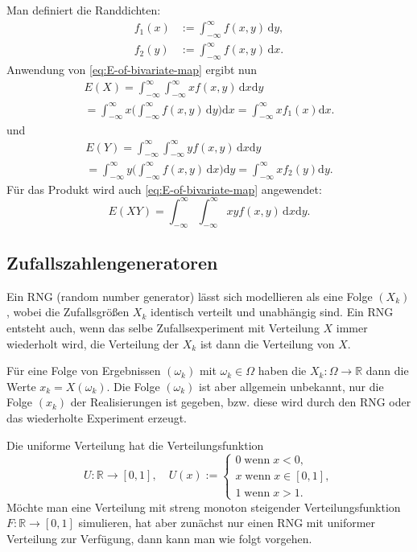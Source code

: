 \documentclass[a4paper,10pt,fleqn,twocolumn,twoside,dvipdfmx]{scrartcl}
\numberwithin{equation}{section}
\newcommand{\R}{\mathbb R}
\theoremstyle{rmbox}
\begin{document}
Man definiert die Randdichten:
\begin{align}
f_1(x) &:= \int_{-\infty}^\infty f(x,y)\,\mathrm dy,\\
f_2(y) &:= \int_{-\infty}^\infty f(x,y)\,\mathrm dx.
\end{align}
Anwendung von \eqref{eq:E-of-bivariate-map} ergibt nun
\begin{gather}
E(X) = \int_{-\infty}^\infty\int_{-\infty}^\infty xf(x,y)\,\mathrm dx\mathrm dy\\
= \int_{-\infty}^\infty x\bigg(\int_{-\infty}^\infty f(x,y)\,\mathrm dy\bigg)\mathrm dx
= \int_{-\infty}^\infty x f_1(x)\mathrm dx.
\end{gather}
und
\begin{gather}
E(Y) = \int_{-\infty}^\infty\int_{-\infty}^\infty yf(x,y)\,\mathrm dx\mathrm dy\\
= \int_{-\infty}^\infty y\bigg(\int_{-\infty}^\infty f(x,y)\,\mathrm dx\bigg)\mathrm dy
= \int_{-\infty}^\infty x f_2(y)\mathrm dy.
\end{gather}
Für das Produkt wird auch \eqref{eq:E-of-bivariate-map} angewendet:
\begin{equation}
E(XY) = \int_{-\infty}^\infty\int_{-\infty}^\infty
xyf(x,y)\,\mathrm dx\mathrm dy.
\end{equation}

\subsection{Zufallszahlengeneratoren}
Ein RNG (random number generator) lässt sich modellieren
als eine Folge $(X_k)$, wobei die Zufallsgrößen $X_k$
identisch verteilt und unabhängig sind. Ein RNG entsteht
auch, wenn das selbe Zufallsexperiment mit Verteilung $X$ immer
wiederholt wird, die Verteilung der $X_k$ ist dann die Verteilung
von $X$.

Für eine Folge von Ergebnissen $(\omega_k)$ mit
$\omega_k\in\Omega$ haben die $X_k\colon\Omega\to\R$ dann die Werte
$x_k=X(\omega_k)$. Die Folge $(\omega_k)$ ist aber allgemein
unbekannt, nur die Folge $(x_k)$ der Realisierungen ist gegeben,
bzw. diese wird durch den RNG oder das wiederholte Experiment
erzeugt.

Die uniforme Verteilung hat die Verteilungsfunktion%
\begin{equation}
U\colon\R\to [0,1],\quad U(x):=\begin{cases}
0\;\text{wenn}\; x<0,\\
x\;\text{wenn}\; x\in[0,1],\\
1\;\text{wenn}\; x>1.
\end{cases}
\end{equation}
Möchte man eine Verteilung mit streng monoton steigender
Verteilungsfunktion $F\colon\R\to[0,1]$ simulieren, hat aber zunächst
nur einen RNG mit uniformer Verteilung zur Verfügung, dann kann man
wie folgt vorgehen.
\end{document}
